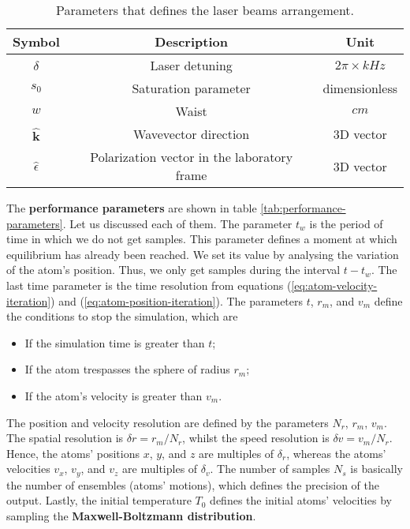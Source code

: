 \begin{table}[ht!]
    \centering
    \begin{tabular}{|c|c|c|}
        \hline
        \textbf{Symbol} & \textbf{Description} & \textbf{Unit} \\ \hline
        $ \delta $ & Laser detuning & $ 2\pi \times kHz $ \\
        $ s_0 $ & Saturation parameter & dimensionless \\
        $ w $ & Waist & $ cm $ \\
        $ \hat{\mathbf{k}} $ & Wavevector direction & 3D vector \\
        $ \hat{\epsilon} $ & Polarization vector in the laboratory frame & 3D vector \\
        \hline
    \end{tabular}
    \caption{Parameters that defines the laser beams arrangement.}
    \label{tab:laser-beams-arrangement-parameters}
\end{table}

The \textbf{performance parameters} are shown in table \ref{tab:performance-parameters}. Let us discussed each of them. The parameter $ t_{w} $ is the period of time in which we do not get samples. This parameter defines a moment at which equilibrium has already been reached. We set its value by analysing the variation of the atom's position. Thus, we only get samples during the interval $ t - t_{w} $. The last time parameter is the time resolution from equations (\ref{eq:atom-velocity-iteration}) and (\ref{eq:atom-position-iteration}). The parameters $ t $, $ r_{m} $, and $ v_{m} $ define the conditions to stop the simulation, which are
\begin{itemize}
    \item If the simulation time is greater than $ t $;
    \item If the atom trespasses the sphere of radius $ r_{m} $;
    \item If the atom's velocity is greater than $ v_{m} $.
\end{itemize}
The position and velocity resolution are defined by the parameters $ N_{r} $, $ r_{m} $, $ v_{m} $. The spatial resolution is $ \delta r = r_{m} / N_{r} $, whilst the speed resolution is $ \delta v = v_{m} / N_r $. Hence, the atoms' positions $ x $, $ y $, and $ z $ are multiples of $ \delta_r $, whereas the atoms' velocities $ v_x $, $ v_y $, and $ v_z $ are multiples of $ \delta_v $. The number of samples $ N_{s} $ is basically the number of ensembles (atoms' motions), which defines the precision of the output. Lastly, the initial temperature $ T_0 $ defines the initial atoms' velocities by sampling the \textbf{Maxwell-Boltzmann distribution}.

